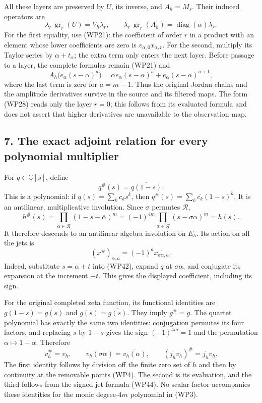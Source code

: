 \documentclass[
  10pt,
  a4paper,
]{article}
\begin{document}
All these layers are preserved by \(U\), its inverse, and \(A_h=M_s\).
Their induced operators are \[
\lambda_r\,\operatorname{gr}_r(U)=V_h\lambda_r,
\qquad
\lambda_r\,\operatorname{gr}_r(A_h)
=\operatorname{diag}(\alpha)\lambda_r.
\tag{WP40}
\] For the first equality, use (WP21): the coefficient of order \(r\) in
a product with an element whose lower coefficients are zero is
\(v_{\alpha,0}x_{\alpha,r}\). For the second, multiply its Taylor series
by \(\alpha+t_\alpha\); the extra term only enters the next layer.
Before passage to a layer, the complete formulas remain (WP21) and \[
A_h\bigl(e_\alpha(s-\alpha)^a\bigr)
=\alpha e_\alpha(s-\alpha)^a+e_\alpha(s-\alpha)^{a+1},
\tag{WP41}
\] where the last term is zero for \(a=m-1\). Thus the original Jordan
chains and the amplitude derivatives survive in the source and its
filtered maps. The form (WP28) reads only the layer \(r=0\); this
follows from its evaluated formula and does not assert that higher
derivatives are unavailable to the observation map.

\subsection{7. The exact adjoint relation for every polynomial
multiplier}\label{the-exact-adjoint-relation-for-every-polynomial-multiplier}

For \(q\in\mathbb C[s]\), define \[
q^\#(s)=\overline{q(1-\overline s)}.
\tag{WP42}
\] This is a polynomial: if \(q(s)=\sum_k c_ks^k\), then
\(q^\#(s)=\sum_k\overline{c_k}(1-s)^k\). It is an antilinear,
multiplicative involution. Since \(\sigma\) permutes \(\mathcal R\), \[
h^\#(s)=\prod_{\alpha\in\mathcal R}(1-s-\overline\alpha)^m
=(-1)^{4m}\prod_{\alpha\in\mathcal R}(s-\sigma\alpha)^m=h(s).
\tag{WP43}
\] It therefore descends to an antilinear algebra involution on \(E_h\).
Its action on all the jets is \[
(x^\#)_{\alpha,a}=(-1)^a\overline{x_{\sigma\alpha,a}}.
\tag{WP44}
\] Indeed, substitute \(s=\alpha+t\) into (WP42), expand \(q\) at
\(\sigma\alpha\), and conjugate its expansion at the increment
\(-\overline t\). This gives the displayed coefficient, including its
sign.

For the original completed zeta function, its functional identities are
\(g(1-s)=g(s)\) and \(g(\overline s)=\overline{g(s)}\). They imply
\(g^\#=g\). The quartet polynomial has exactly the same two identities:
conjugation permutes its four factors, and replacing \(s\) by \(1-s\)
gives the sign \((-1)^{4m}=1\) and the permutation
\(\alpha\mapsto1-\alpha\). Therefore \[
v_h^\#=v_h,\qquad v_h(\sigma\alpha)=\overline{v_h(\alpha)},
\qquad (j_hv_h)^\#=j_hv_h.
\tag{WP44a}
\] The first identity follows by division off the finite zero set of
\(h\) and then by continuity at the removable points (WP4). The second
is its evaluation, and the third follows from the signed jet formula
(WP44). No scalar factor accompanies these identities for the monic
degree-\(4m\) polynomial in (WP3).
\end{document}
